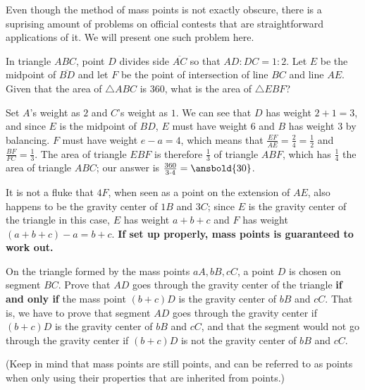 \documentclass{article}
\begin{document}
\bigskip
Even though the method of mass points is not exactly obscure, there is a suprising amount of problems on official contests that are straightforward applications of it. We will present one such problem here.
\begin{exam}[AMC 8 2019/24]
In triangle $ABC$, point $D$ divides side $\overline{AC}$ so that $AD:DC=1:2$. Let $E$ be the midpoint of $\overline{BD}$ and let $F$ be the point of intersection of line $BC$ and line $AE$. Given that the area of $\triangle ABC$ is $360$, what is the area of $\triangle EBF$?
\end{exam}
\begin{sol}
Set $A$'s weight as $2$ and $C$'s weight as $1$. We can see that $D$ has weight $2+1=3$, and since $E$ is the midpoint of $BD$, $E$ must have weight $6$ and $B$ has weight $3$ by balancing. $F$ must have weight $e-a=4$, which means that $\frac{EF}{AE}=\frac{2}{4}=\frac{1}{2}$ and $\frac{BF}{FC}=\frac{1}{3}$. The area of triangle $EBF$ is therefore $\frac{1}{3}$ of triangle $ABF$, which has $\frac{1}{4}$ the area of triangle $ABC$; our answer is $\frac{360}{3\cdot 4}=\ansbold{30}$.
\end{sol}
\begin{remark}
It is not a fluke that $4F$, when seen as a point on the extension of $AE$, also happens to be the gravity center of $1B$ and $3C$; since $E$ is the gravity center of the triangle in this case, $E$ has weight $a+b+c$ and $F$ has weight $(a+b+c)-a=b+c$. \textbf{If set up properly, mass points is guaranteed to work out.}
\end{remark}
\begin{exer}
On the triangle formed by the mass points $aA,bB,cC$, a point $D$ is chosen on segment $BC$. Prove that $AD$ goes through the gravity center of the triangle \textbf{if and only if} the mass point $(b+c)D$ is the gravity center of $bB$ and $cC$. That is, we have to prove that segment $AD$ goes through the gravity center if $(b+c)D$ is the gravity center of $bB$ and $cC$, and that the segment would not go through the gravity center if $(b+c)D$ is not the gravity center of $bB$ and $cC$.

(Keep in mind that mass points are still points, and can be referred to as points when only using their properties that are inherited from points.)
\end{exer}
\newpage
\end{document}
